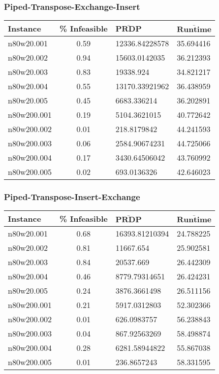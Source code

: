 \begin{homeworkProblem}
\subsubsection{Piped-Transpose-Exchange-Insert}
\begin{center}
\begin{tabular}{|l|c|l|l|}
\hline
\textbf{Instance}& \textbf{\% Infeasible} & $\mathbf{\bar{PRDP}}$ &$\mathbf{\bar{Runtime}}$\\
\hline
n80w20.001&0.59&12336.84228578&35.694416\\
\hline
n80w20.002&0.94&15603.0142035&36.212393\\
\hline
n80w20.003&0.83&19338.924&34.821217\\
\hline
n80w20.004&0.55&13170.33921962&36.438959\\
\hline
n80w20.005&0.45&6683.336214&36.202891\\
\hline
n80w200.001&0.19&5104.3621015&40.772642\\
\hline
n80w200.002&0.01&218.8179842&44.241593\\
\hline
n80w200.003&0.06&2584.90674231&44.725066\\
\hline
n80w200.004&0.17&3430.64506042&43.760992\\
\hline
n80w200.005&0.02&693.0136326&42.646023\\
\hline

\end{tabular}
\end{center}

\subsubsection{Piped-Transpose-Insert-Exchange}
\begin{center}
\begin{tabular}{|l|c|l|l|}
\hline
\textbf{Instance}& \textbf{\% Infeasible} & $\mathbf{\bar{PRDP}}$ &$\mathbf{\bar{Runtime}}$\\
\hline
n80w20.001&0.68&16393.81210394&24.788225\\
\hline
n80w20.002&0.81&11667.654&25.902581\\
\hline
n80w20.003&0.84&20537.669&26.442309\\
\hline
n80w20.004&0.46&8779.79314651&26.424231\\
\hline
n80w20.005&0.24&3876.3661498&26.511156\\
\hline
n80w200.001&0.21&5917.0312803&52.302366\\
\hline
n80w200.002&0.01&626.0983757&56.238843\\
\hline
n80w200.003&0.04&867.92563269&58.498874\\
\hline
n80w200.004&0.28&6281.58944822&55.867038\\
\hline
n80w200.005&0.01&236.8657243&58.331595\\
\hline


\end{tabular}
\end{center}
\end{homeworkProblem}
